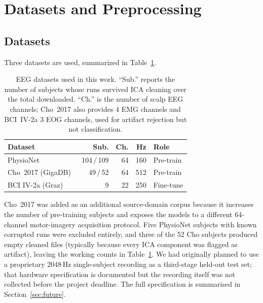 \documentclass[conference]{IEEEtran}
\begin{document}
\section{Datasets and Preprocessing}

\subsection{Datasets}

Three datasets are used, summarized in Table~\ref{tab:datasets}.

\begin{table}[!t]
\caption{EEG datasets used in this work. ``Sub.'' reports the number of
subjects whose runs survived ICA cleaning over the total downloaded.
``Ch.'' is the number of scalp EEG channels; Cho~2017 also provides 4 EMG
channels and BCI~IV-2a 3 EOG channels, used for artifact rejection but not
classification.}
\label{tab:datasets}
\centering
\small
\renewcommand{\arraystretch}{1.15}
\setlength{\tabcolsep}{4pt}
\begin{tabular}{@{}l r r r l@{}}
\toprule
\textbf{Dataset} & \textbf{Sub.} & \textbf{Ch.} & \textbf{Hz} & \textbf{Role} \\
\midrule
PhysioNet~\cite{ref:goldberger2000,ref:schalk2004}
  & 104\,/\,109 & 64 & 160  & Pre-train \\
Cho~2017 (GigaDB)~\cite{ref:cho2017}
  &  49\,/\,52  & 64 & 512  & Pre-train \\
BCI IV-2a (Graz)~\cite{ref:brunner2008}
  &   9 & 22 & 250  & Fine-tune \\
\bottomrule
\end{tabular}
\end{table}

Cho~2017 was added as an additional source-domain corpus because it increases
the number of pre-training subjects and exposes the models to a different
64-channel motor-imagery acquisition protocol. Five PhysioNet subjects with
known corrupted runs were excluded entirely, and three of the 52 Cho subjects
produced empty cleaned files (typically because every ICA component was flagged
as artifact), leaving the working counts in Table~\ref{tab:datasets}. We had
originally planned to use a proprietary 2048\,Hz single-subject recording as a
third-stage held-out test set; that hardware specification is documented but
the recording itself was not collected before the project deadline. The full
specification is summarised in Section~\ref{sec:future}.
\end{document}
